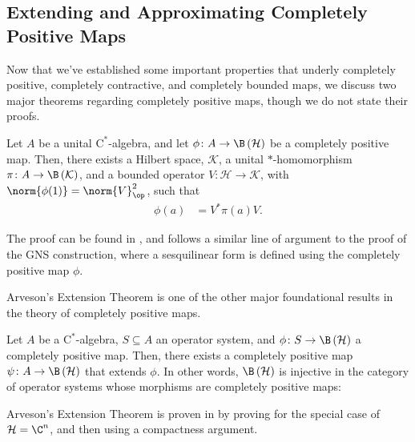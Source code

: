 \subsection{Extending and Approximating Completely Positive Maps}%
Now that we've established some important properties that underly completely positive, completely contractive, and completely bounded maps, we discuss two major theorems regarding completely positive maps, though we do not state their proofs.
\begin{theorem}\label{thm:stinespring_dilation}
  Let $A$ be a unital $\mathrm{C}^{\ast}$-algebra, and let $\phi\colon A\rightarrow \B\left( \mathcal{H} \right)$ be a completely positive map. Then, there exists a Hilbert space, $\mathcal{K}$, a unital $\ast$-homomorphism $\pi\colon A\rightarrow \B\left( \mathcal{K} \right)$, and a bounded operator $V\colon \mathcal{H}\rightarrow \mathcal{K}$, with $\norm{\phi(1)} = \norm{V}_{\op}^2$, such that
  \begin{align*}
    \phi(a) &= V^{\ast}\pi(a)V.
  \end{align*}
\end{theorem}
The proof can be found in \cite[Chapter 4]{completely_bounded_maps_and_operator_algebras}, and follows a similar line of argument to the proof of the GNS construction, where a sesquilinear form is defined using the completely positive map $\phi$.\newline

Arveson's Extension Theorem is one of the other major foundational results in the theory of completely positive maps.
\begin{theorem}\label{thm:arveson}
  Let $A$ be a $\mathrm{C}^{\ast}$-algebra, $S\subseteq A$ an operator system, and $\phi\colon S\rightarrow \B\left( \mathcal{H} \right)$ a completely positive map. Then, there exists a completely positive map $\psi\colon A\rightarrow \B\left( \mathcal{H} \right)$ that extends $\phi$. In other words, $\B\left( \mathcal{H} \right)$ is injective in the category of operator systems whose morphisms are completely positive maps:
  \begin{center}
  \end{center}
\end{theorem}
Arveson's Extension Theorem is proven in \cite[Chapter 7]{completely_bounded_maps_and_operator_algebras} by proving for the special case of $\mathcal{H} = \C^n$, and then using a compactness argument.\newline


